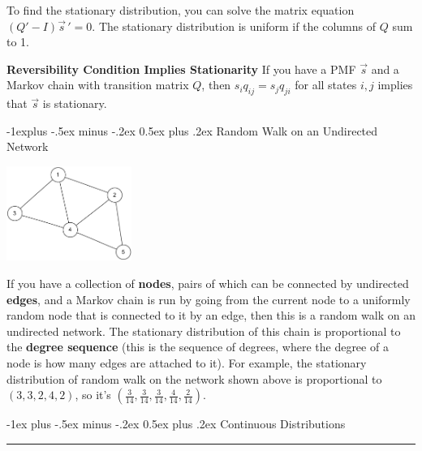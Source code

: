 \documentclass[10pt,landscape]{article}
\makeatletter
\renewcommand{\section}{\@startsection{section}{1}{0mm}%
                                {-1ex plus -.5ex minus -.2ex}%
                                {0.5ex plus .2ex}%
                                {\normalfont\large\bfseries}}
\renewcommand{\subsection}{\@startsection{subsection}{2}{0mm}%
                                {-1explus -.5ex minus -.2ex}%
                                {0.5ex plus .2ex}%
                                {\normalfont\normalsize\bfseries}}
\makeatother
\begin{document}
\begin{multicols*}{3}
\smallskip

 To find the stationary distribution, you can solve the matrix equation $(Q' - I){\vec{s}\,}'= 0$. The stationary distribution is uniform if the columns of $Q$ sum to 1.

\smallskip

\textbf{Reversibility Condition Implies Stationarity}  If you have a PMF $\vec{s}$ and a Markov chain with transition matrix $Q$, then $s_iq_{ij} = s_jq_{ji}$ for all states $i, j$ implies that $\vec{s}$ is stationary.

\subsection{Random Walk on an Undirected Network}
 \begin{minipage}{\linewidth}
            \centering
\includegraphics[width=1.6in]{figures/network1.pdf}
        \end{minipage}
\medskip

If you have a collection of \textbf{nodes}, pairs of which can be connected by undirected \textbf{edges}, and a Markov chain is run by going from the current node to a uniformly random node that is connected to it by an edge, then  this is a random walk on an undirected network. The stationary distribution of this chain is proportional to the \textbf{degree sequence} (this is the sequence of degrees, where the degree of a node is how many edges are attached to it). For example, the stationary distribution of random walk on the network shown above is proportional to $(3,3,2,4,2)$, so it's $(\frac{3}{14}, \frac{3}{14}, \frac{3}{14}, \frac{4}{14}, \frac{2}{14})$. 

\section{Continuous Distributions}\smallskip \hrule height 2pt \smallskip


\end{multicols*}
\end{document}
